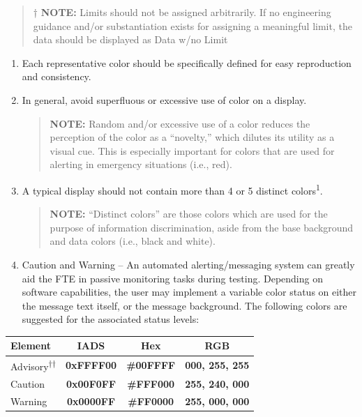\documentclass[
]{book}
\begin{document}
\begin{enumerate}
\begin{enumerate}
    \begin{quote}
    † \textbf{NOTE:} Limits should not be assigned arbitrarily. If no engineering guidance and/or substantiation exists for assigning a meaningful limit, the data should be displayed as Data w/no Limit
    \end{quote}

    \begin{enumerate}
    \def\labelenumiii{\arabic{enumiii}.}
    \setcounter{enumiii}{4}
    \item
      Each representative color should be specifically defined for easy reproduction and consistency.
    \item
      In general, avoid superfluous or excessive use of color on a display.

      \begin{quote}
      \textbf{NOTE:} Random and/or excessive use of a color reduces the perception of the color as a ``novelty,'' which dilutes its utility as a visual cue. This is especially important for colors that are used for alerting in emergency situations (i.e., red).
      \end{quote}
    \item
      A typical display should not contain more than 4 or 5 distinct colors\textsuperscript{1}.

      \begin{quote}
      \textbf{NOTE:} ``Distinct colors'' are those colors which are used for the purpose of information discrimination, aside from the base background and data colors (i.e., black and white).
      \end{quote}
    \item
      Caution and Warning -- An automated alerting/messaging system can greatly aid the FTE in passive monitoring tasks during testing. Depending on software capabilities, the user may implement a variable color status on either the message text itself, or the message background. The following colors are suggested for the associated status levels:
    \end{enumerate}

    \begin{longtable}[]{@{}lccc@{}}
    \toprule
    Element & IADS & Hex & RGB\tabularnewline
    \midrule
    \endhead
    Advisory\textsuperscript{††} & \textbf{\colorbox[HTML]{000000}{\textcolor[HTML]{00FFFF}{0xFFFF00}}} & \textbf{\colorbox[HTML]{000000}{\textcolor[HTML]{00FFFF}{\#00FFFF}}} & \textbf{\colorbox[HTML]{000000}{\textcolor[HTML]{00FFFF}{000, 255, 255}}}\tabularnewline
    Caution & \textbf{\colorbox[HTML]{000000}{\textcolor[HTML]{FFF000}{0x00F0FF}}} & \textbf{\colorbox[HTML]{000000}{\textcolor[HTML]{FFF000}{\#FFF000}}} & \textbf{\colorbox[HTML]{000000}{\textcolor[HTML]{FFF000}{255, 240, 000}}}\tabularnewline
    Warning & \textbf{\colorbox[HTML]{000000}{\textcolor[HTML]{FF0000}{0x0000FF}}} & \textbf{\colorbox[HTML]{000000}{\textcolor[HTML]{FF0000}{\#FF0000}}} & \textbf{\colorbox[HTML]{000000}{\textcolor[HTML]{FF0000}{255, 000, 000}}}\tabularnewline
    \bottomrule
    \end{longtable}


\end{enumerate}
\end{enumerate}
\end{document}
